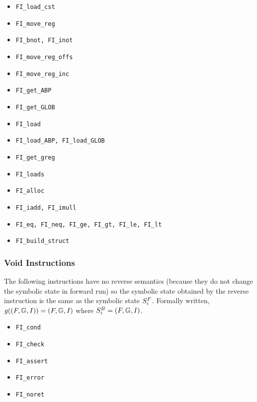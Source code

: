 \begin{itemize}

	\item {\tt FI\_load\_cst}

	\item {\tt FI\_move\_reg}

	\item {\tt FI\_bnot, FI\_inot}

	\item {\tt FI\_move\_reg\_offs}

	\item {\tt FI\_move\_reg\_inc}

	\item {\tt FI\_get\_ABP}

	\item {\tt FI\_get\_GLOB}

	\item {\tt FI\_load}
	
	\item {\tt FI\_load\_ABP, FI\_load\_GLOB}
	
	\item {\tt FI\_get\_greg}
	
	\item {\tt FI\_loads}
	
	\item {\tt FI\_alloc}

	\item {\tt FI\_iadd, FI\_imull}

	\item {\tt FI\_eq, FI\_neq, FI\_ge, FI\_gt, FI\_le, FI\_lt}
	
	\item {\tt FI\_build\_struct}

\end{itemize}

\subsubsection{Void Instructions}
The following instructions have no reverse semantics
(because they do not change the symbolic state in forward run)
so the symbolic state obtained by the reverse instruction
is the same as the symbolic state $S^{F}_{i}$.
Formally written, $g((F, \mathbb{G}, I)) = (F, \mathbb{G}, I)$ where $S^{B}_{i} = (F, \mathbb{G}, I)$.

\begin{itemize}
	
	\item {\tt FI\_cond}
	
	\item {\tt FI\_check}
	
	\item {\tt FI\_assert}
	
	\item {\tt FI\_error}
	
	\item {\tt FI\_noret}

\end{itemize}

